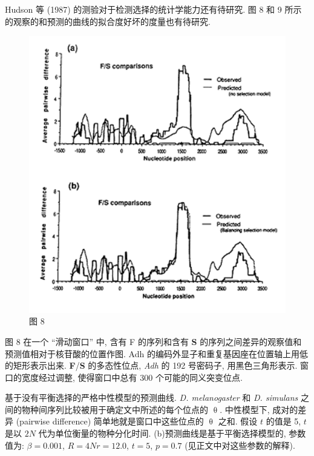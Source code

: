 \documentclass[
    12pt,%
    ]{article}
\begin{document}
Hudson 等 (1987) 的测验对于检测选择的统计学能力还有待研究. 图 8 和 9
所示的观察的和预测的曲线的拟合度好坏的度量也有待研究.

\begin{figure}
\centering
\includegraphics{coalescent-process.images/image8.png}
\caption{图 8}
\end{figure}

图 8 在一个 ``滑动窗口'' 中, 含有 F 的序列和含有 \textbf{S} 的序列之间差异的观察值和预测值相对于核苷酸的位置作图. Adh
的编码外显子和重复基因座在位置轴上用低的矩形表示出来. \textbf{F}/\textbf{S} 的多态性位点, \textit{Adh} 的 192
号密码子, 用黑色三角形表示. 窗口的宽度经过调整, 使得窗口中总有 300 个可能的同义突变位点.

基于没有平衡选择的严格中性模型的预测曲线. \textit{D. melanogaster} 和 \textit{D. simulans}
之间的物种间序列比较被用于确定文中所述的每个位点的 $\uptheta$. 中性模型下, 成对的差异 (pairwise difference)
简单地就是窗口中这些位点的 $\uptheta$ 之和. 假设 $t$ 的值是 5, $t$ 是以 $2N$ 代为单位衡量的物种分化时间.
(b)预测曲线是基于平衡选择模型的, 参数值为: $\beta = 0.001$, $R = 4Nr = 12.0$, $t=5$, $p=0.7$
(见正文中对这些参数的解释).
\end{document}
